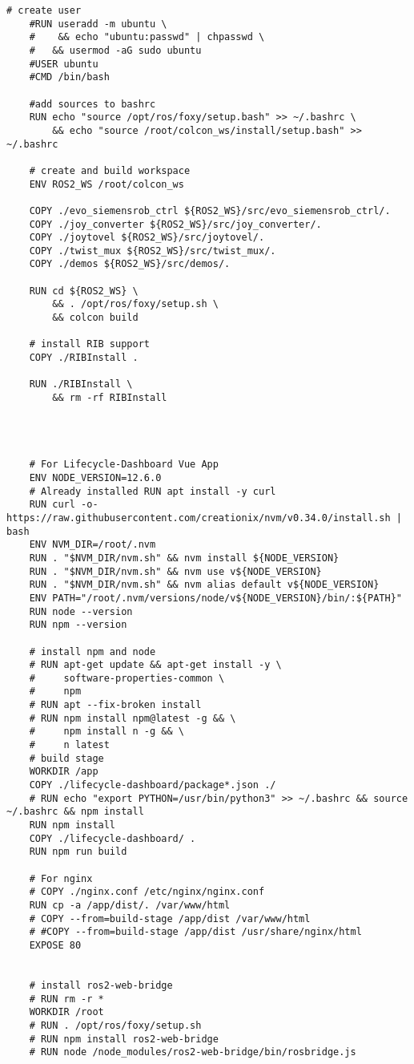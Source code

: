 \begin{lstlisting}[language=docker,
	caption={Dockerfile}, 
	label={code:DockerTestumgebung}]
	# create user
	#RUN useradd -m ubuntu \
	#    && echo "ubuntu:passwd" | chpasswd \
	#	&& usermod -aG sudo ubuntu
	#USER ubuntu
	#CMD /bin/bash

	#add sources to bashrc
	RUN echo "source /opt/ros/foxy/setup.bash" >> ~/.bashrc \
		&& echo "source /root/colcon_ws/install/setup.bash" >> ~/.bashrc

	# create and build workspace
	ENV ROS2_WS /root/colcon_ws
		
	COPY ./evo_siemensrob_ctrl ${ROS2_WS}/src/evo_siemensrob_ctrl/.
	COPY ./joy_converter ${ROS2_WS}/src/joy_converter/.
	COPY ./joytovel ${ROS2_WS}/src/joytovel/.
	COPY ./twist_mux ${ROS2_WS}/src/twist_mux/.
	COPY ./demos ${ROS2_WS}/src/demos/.

	RUN cd ${ROS2_WS} \
		&& . /opt/ros/foxy/setup.sh \
		&& colcon build
		
	# install RIB support
	COPY ./RIBInstall .

	RUN ./RIBInstall \
		&& rm -rf RIBInstall
		



	# For Lifecycle-Dashboard Vue App
	ENV NODE_VERSION=12.6.0
	# Already installed RUN apt install -y curl
	RUN curl -o- https://raw.githubusercontent.com/creationix/nvm/v0.34.0/install.sh | bash
	ENV NVM_DIR=/root/.nvm
	RUN . "$NVM_DIR/nvm.sh" && nvm install ${NODE_VERSION}
	RUN . "$NVM_DIR/nvm.sh" && nvm use v${NODE_VERSION}
	RUN . "$NVM_DIR/nvm.sh" && nvm alias default v${NODE_VERSION}
	ENV PATH="/root/.nvm/versions/node/v${NODE_VERSION}/bin/:${PATH}"
	RUN node --version
	RUN npm --version

	# install npm and node
	# RUN apt-get update && apt-get install -y \
	#     software-properties-common \
	#     npm
	# RUN apt --fix-broken install
	# RUN npm install npm@latest -g && \
	#     npm install n -g && \
	#     n latest
	# build stage
	WORKDIR /app
	COPY ./lifecycle-dashboard/package*.json ./
	# RUN echo "export PYTHON=/usr/bin/python3" >> ~/.bashrc && source ~/.bashrc && npm install
	RUN npm install
	COPY ./lifecycle-dashboard/ .
	RUN npm run build

	# For nginx
	# COPY ./nginx.conf /etc/nginx/nginx.conf
	RUN cp -a /app/dist/. /var/www/html
	# COPY --from=build-stage /app/dist /var/www/html
	# #COPY --from=build-stage /app/dist /usr/share/nginx/html
	EXPOSE 80


	# install ros2-web-bridge
	# RUN rm -r *
	WORKDIR /root
	# RUN . /opt/ros/foxy/setup.sh
	# RUN npm install ros2-web-bridge
	# RUN node /node_modules/ros2-web-bridge/bin/rosbridge.js



\end{lstlisting}
